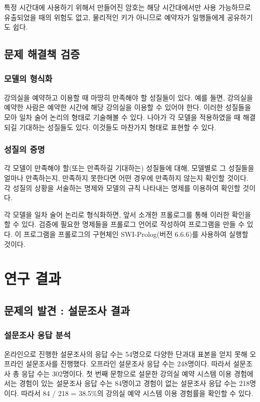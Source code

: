 \documentclass[11pt,a4paper]{article}
\begin{document}
특정 시간대에 사용하기 위해서 만들어진 암호는 해당 시간대에서만 사용 가능하므로
유출되었을 때의 위험도 없고, 물리적인 키가 아니므로 예약자가 일행들에게
공유하기도 쉽다.

\subsection{문제 해결책 검증}

\subsubsection{모델의 형식화}
강의실을 예약하고 이용할 때 마땅히 만족해야 할 성질들이 있다. 예를 들면,
강의실을 예약한 사람은 예약한 시간에 해당 강의실을 이용할 수 있어야 한다.
이러한 성질들을 모아 일차 술어 논리의 형태로 기술해볼 수 있다. 나아가 각 모델을
적용하였을 때 해결되길 기대하는 성질들도 있다. 이것들도 마찬가지 형태로 표현할
수 있다.

\subsubsection{성질의 증명}
각 모델이 만족해야 할(또는 만족하길 기대하는) 성질들에 대해, 모델별로 그
성질들을 얼마나 만족하는지, 만족하지 못한다면 어떤 경우에 만족하지 않는지
확인할 것이다. 각 성질의 상황을 서술하는 명제와 모델의 규칙 나타내는 명제를
이용하여 확인할 것이다.

각 모델을 일차 술어 논리로 형식화하면, 앞서 소개한 프롤로그를 통해 이러한
확인을 할 수 있다. 검증에 필요한 명제들을 프롤로그 언어로 작성하여 프로그램을
만들 수 있다. 이 프로그램을 프롤로그의 구현체인 SWI-Prolog(버전 6.6.6)를
사용하여 실행할 것이다.

\section{연구 결과}

\subsection{문제의 발견 : 설문조사 결과}

\subsubsection{설문조사 응답 분석}
온라인으로 진행한 설문조사의 응답 수는 54명으로 다양한 단과대 표본을 얻지 못해
오프라인 설문조사를 진행했다. 오프라인 설문조사 응답 수는 248명이다. 따라서
설문조사 총 응답 수는 302명이다. 첫 번째 문항으로 설문한 강의실 예약 시스템
이용 경험에서는 경험이 있는 설문조사 응답 수는 84명이고 경험이 없는 설문조사
응답 수는 218명이다. 따라서 84 / 218 = 38.5\%의 강의실 예약 시스템 이용
경험률을 확인할 수 있다.
\end{document}
